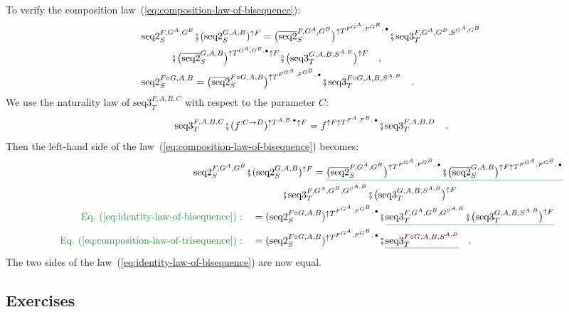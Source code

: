 To verify the composition law~(\ref{eq:composition-law-of-bisequence}):
\begin{align*}
 & \text{seq2}_{S}^{F,G^{A},G^{B}}\bef(\text{seq2}_{S}^{G,A,B})^{\uparrow F}=\big(\overline{\text{seq2}}_{S}^{F,G^{A},G^{B}}\big)^{\uparrow T^{F^{G^{A}},F^{G^{B}},\,\bullet}}\bef\text{seq3}_{T}^{F,G^{A},G^{B},S^{G^{A},G^{B}}}\\
 & \quad\quad\quad\bef\big(\overline{\text{seq2}}_{S}^{G,A,B}\big)^{\uparrow T^{G^{A},G^{B},\bullet}\uparrow F}\bef\big(\text{seq3}_{T}^{G,A,B,S^{A,B}}\big)^{\uparrow F}\quad,\\
 & \text{seq2}_{S}^{F\circ G,A,B}=\big(\overline{\text{seq2}}_{S}^{F\circ G,A,B}\big)^{\uparrow T^{F^{G^{A}},F^{G^{B}},\,\bullet}}\bef\text{seq3}_{T}^{F\circ G,A,B,S^{A,B}}\quad.
\end{align*}
We use the naturality law of $\text{seq3}_{T}^{F,A,B,C}$ with respect
to the parameter $C$:
\[
\text{seq3}_{T}^{F,A,B,C}\bef(f^{:C\rightarrow D})^{\uparrow T^{A,B,\bullet}\uparrow F}=f^{\uparrow F\uparrow T^{F^{A},F^{B},\,\bullet}}\bef\text{seq3}_{T}^{F,A,B,D}\quad.
\]
Then the left-hand side of the law~(\ref{eq:composition-law-of-bisequence})
becomes:
\begin{align*}
\text{seq2}_{S}^{F,G^{A},G^{B}}\bef & (\text{seq2}_{S}^{G,A,B})^{\uparrow F}=\gunderline{\big(\overline{\text{seq2}}_{S}^{F,G^{A},G^{B}}\big)^{\uparrow T^{F^{G^{A}},F^{G^{B}},\,\bullet}}\bef\big(\overline{\text{seq2}}_{S}^{G,A,B}\big)^{\uparrow F\uparrow T^{F^{G^{A}},F^{G^{B}},\,\bullet}}}\\
 & \quad\quad\quad\bef\text{seq3}_{T}^{F,G^{A},G^{B},G^{S^{A,B}}}\bef\big(\text{seq3}_{T}^{G,A,B,S^{A,B}}\big)^{\uparrow F}\\
{\color{greenunder}\text{Eq.~(\ref{eq:identity-law-of-bisequence})}:}\quad & =(\text{seq2}_{S}^{F\circ G,A,B})^{\uparrow T^{F^{G^{A}},F^{G^{B}},\,\bullet}}\bef\gunderline{\text{seq3}_{T}^{F,G^{A},G^{B},G^{S^{A,B}}}\bef\big(\text{seq3}_{T}^{G,A,B,S^{A,B}}\big)^{\uparrow F}}\\
{\color{greenunder}\text{Eq.~(\ref{eq:composition-law-of-trisequence})}:}\quad & =(\text{seq2}_{S}^{F\circ G,A,B})^{\uparrow T^{F^{G^{A}},F^{G^{B}},\,\bullet}}\bef\gunderline{\text{seq3}_{T}^{F\circ G,A,B,S^{A,B}}}\quad.
\end{align*}
The two sides of the law~(\ref{eq:identity-law-of-bisequence}) are
now equal.

\subsection{Exercises}

